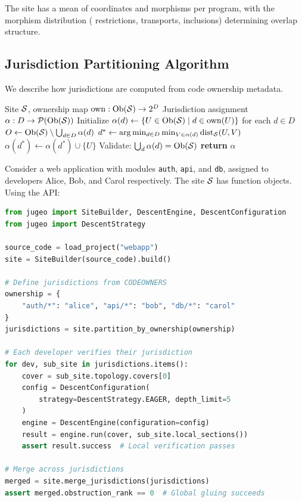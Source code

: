 \documentclass[11pt]{article}
\begin{document}
The site has a mean of \compSiteMeanCoords{} coordinates and
\compSiteMeanMorphisms{} morphisms per program, with the morphism distribution
(\compMorphRestriction{} restrictions, \compMorphTransport{} transports,
\compMorphInclusion{} inclusions) determining overlap structure.

\subsection{Jurisdiction Partitioning Algorithm}

We describe how jurisdictions are computed from code ownership metadata.

\begin{algorithm}[t]
\caption{Jurisdiction Partitioning from Code Ownership}
\label{alg:jurisdiction}
\begin{algorithmic}[1]
\REQUIRE Site $\mathcal{S}$, ownership map $\mathrm{own} : \mathrm{Ob}(\mathcal{S}) \to 2^D$
\ENSURE Jurisdiction assignment $\alpha : D \to \mathcal{P}(\mathrm{Ob}(\mathcal{S}))$
\STATE Initialize $\alpha(d) \gets \{U \in \mathrm{Ob}(\mathcal{S}) \mid d \in \mathrm{own}(U)\}$
        for each $d \in D$
\STATE $O \gets \mathrm{Ob}(\mathcal{S}) \setminus \bigcup_{d \in D} \alpha(d)$
  \STATE $d^* \gets \arg\min_{d \in D} \min_{V \in \alpha(d)}
          \mathrm{dist}_{\mathcal{S}}(U, V)$
  \STATE $\alpha(d^*) \gets \alpha(d^*) \cup \{U\}$
\ENDFOR
\STATE Validate: $\bigcup_d \alpha(d) = \mathrm{Ob}(\mathcal{S})$
\STATE \textbf{return} $\alpha$
\end{algorithmic}
\end{algorithm}

\begin{example}
Consider a web application with modules \texttt{auth}, \texttt{api}, and
\texttt{db}, assigned to developers Alice, Bob, and Carol respectively. The
site $\mathcal{S}$ has \compSiteTotalFunctions{} function objects. Using the
\JuGeo{} API:

\begin{lstlisting}[language=Python,basicstyle=\small\ttfamily,frame=single,
  xleftmargin=1em]
from jugeo import SiteBuilder, DescentEngine, DescentConfiguration
from jugeo import DescentStrategy

source_code = load_project("webapp")
site = SiteBuilder(source_code).build()

# Define jurisdictions from CODEOWNERS
ownership = {
    "auth/*": "alice", "api/*": "bob", "db/*": "carol"
}
jurisdictions = site.partition_by_ownership(ownership)

# Each developer verifies their jurisdiction
for dev, sub_site in jurisdictions.items():
    cover = sub_site.topology.covers[0]
    config = DescentConfiguration(
        strategy=DescentStrategy.EAGER, depth_limit=5
    )
    engine = DescentEngine(configuration=config)
    result = engine.run(cover, sub_site.local_sections())
    assert result.success  # Local verification passes

# Merge across jurisdictions
merged = site.merge_jurisdictions(jurisdictions)
assert merged.obstruction_rank == 0  # Global gluing succeeds
\end{lstlisting}
\end{example}
\end{document}
